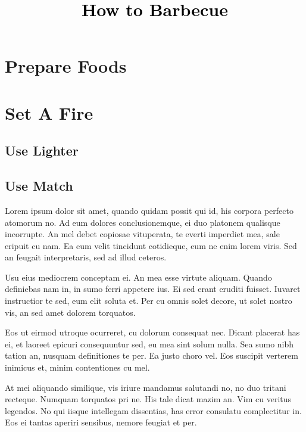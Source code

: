 \documentclass[a4paper]{article}
\newcommand{\PaperTitle}{How to Barbecue}  %
\begin{document}
\newpage

\title{
	\Large{\textcolor{black}{\PaperTitle}}
}
	
	
\maketitle
	
\tableofcontents
 
\newpage

\setcounter{page}{1}

\section{Prepare Foods}

\section{Set A Fire}

\subsection{Use Lighter}
\subsection{Use Match}

Lorem ipsum dolor sit amet, quando quidam possit qui id, his corpora perfecto atomorum no. Ad eum dolores conclusionemque, ei duo platonem qualisque incorrupte. An mel debet copiosae vituperata, te everti imperdiet mea, sale eripuit cu nam. Ea eum velit tincidunt cotidieque, eum ne enim lorem viris. Sed an feugait interpretaris, sed ad illud ceteros.

Usu eius mediocrem conceptam ei. An mea esse virtute aliquam. Quando definiebas nam in, in sumo ferri appetere ius. Ei sed erant eruditi fuisset. Iuvaret instructior te sed, eum elit soluta et. Per cu omnis solet decore, ut solet nostro vis, an sed amet dolorem torquatos.

Eos ut eirmod utroque ocurreret, cu dolorum consequat nec. Dicant placerat has ei, et laoreet epicuri consequuntur sed, eu mea sint solum nulla. Sea sumo nibh tation an, nusquam definitiones te per. Ea justo choro vel. Eos suscipit verterem inimicus et, minim contentiones cu mel.

At mei aliquando similique, vis iriure mandamus salutandi no, no duo tritani recteque. Numquam torquatos pri ne. His tale dicat mazim an. Vim cu veritus legendos. No qui iisque intellegam dissentias, has error consulatu complectitur in. Eos ei tantas aperiri sensibus, nemore feugiat et per.
\end{document}
